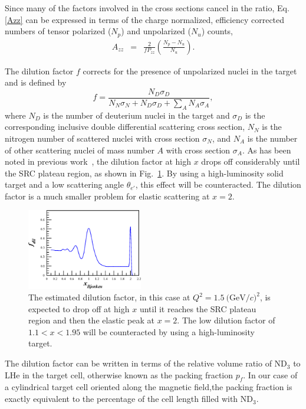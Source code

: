 Since many of the factors involved in the cross sections cancel in
the ratio, Eq. \ref{Azz} can be expressed in terms 
of the charge normalized, efficiency corrected numbers of tensor polarized ($N_p$) and unpolarized ($N_u$) counts, 
\begin{eqnarray} \label{3}
A_{zz}&=&\frac{2}{fP_{zz}}\left(\frac{N_p - N_u}{N_u}\right) .
\end{eqnarray}

The dilution factor $f$ corrects for the presence of unpolarized nuclei in the target and is defined by
\begin{equation}
f=\frac{N_D\sigma_D}{N_N\sigma_N+N_D\sigma_D+\sum\limits_{A} N_A\sigma_A},
\end{equation}
where $N_D$ is the number of deuterium nuclei in the target and $\sigma_D$ is the corresponding inclusive double differential scattering cross 
section, $N_N$ is the nitrogen number of scattered nuclei with cross section $\sigma_N$, and $N_A$ is the number of other scattering nuclei of mass number $A$ with cross section $\sigma_A$. As has been noted in previous work~\cite{Frankfurt:1988nt}, the dilution factor at high $x$ drops off considerably until the SRC plateau region, as shown in Fig.~\ref{fdil}. By using a high-luminosity solid target and a low scattering angle $\theta_{e'}$, this effect will be counteracted. The dilution factor is a much smaller problem for elastic scattering at $x=2$.

\begin{figure}
\begin{center}
\includegraphics[width=0.45\textwidth]{figs/fdil_q2_15.eps}
\caption{\label{fdil}The estimated dilution factor, in this case at $Q^2=1.5 \mathrm{~(GeV}/c)^2$, is expected to drop off at high $x$ until it reaches the SRC plateau region and then the elastic peak at $x=2$. The low dilution factor of $1.1<x<1.95$ will be counteracted by using a high-luminosity target.}
\end{center}
\end{figure}

The dilution factor can be written in terms of the relative volume ratio of ND$_3$ to LHe in the target cell, otherwise known as the packing fraction $p_f$.  
In our case of a cylindrical target cell oriented along the magnetic field,the packing fraction is exactly equivalent to the percentage of the cell length filled with ND$_3$.  

